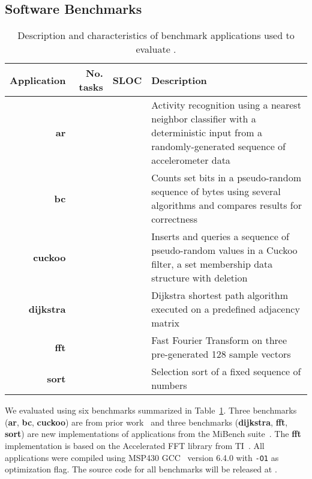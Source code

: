 \subsection{Software Benchmarks}
\label{sec:software_benchmarks}

\begin{table}
	\centering
	\footnotesize
	\begin{tabular}{| r|r|r | p{} |}
		\hline
		Application & No. tasks & SLOC & Description \\
		\hline\hline
        \textbf{ar} & & & Activity recognition using a nearest neighbor
classifier with a deterministic input from a randomly-generated sequence of
accelerometer data\\
		\hline
        \textbf{bc} & & & Counts set bits in a pseudo-random sequence of bytes
using several algorithms and compares results for correctness\\
		\hline
        \textbf{cuckoo} & & & Inserts and queries a sequence of pseudo-random
values in a Cuckoo filter, a set membership data structure with deletion\\
		\hline
        \textbf{dijkstra} &  & & Dijkstra shortest path algorithm executed on a
predefined adjacency matrix\\
		\hline
        \textbf{fft} & & & Fast Fourier Transform on three pre-generated 128
sample vectors\\
		\hline
		\textbf{sort} & & & Selection sort of a fixed sequence of numbers\\
		\hline
	\end{tabular}
\caption{Description and characteristics of benchmark applications used to
evaluate \sys.}
\label{table:benchmark_table}
\end{table}

We evaluated \sys using six benchmarks summarized in
Table~\ref{table:benchmark_table}. %
Three benchmarks (\textbf{ar}, \textbf{bc}, \textbf{cuckoo}) are from prior
work~\cite{chain,alpaca} and three benchmarks (\textbf{dijkstra},
\textbf{fft}, \textbf{sort}) are new implementations of applications
from the MiBench suite~\cite{mibench,hicks_mibench2_2016}. The
\textbf{fft} implementation is based on the Accelerated FFT library from
TI~\cite{ti-fft}.
%
%
All applications were compiled using MSP430 GCC~\cite{ti-gcc} version 6.4.0 with
\texttt{-O1} as optimization flag.
%
The source code for all benchmarks will be released at \cite{coala_website}.


